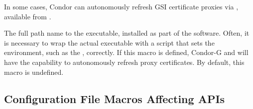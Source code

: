 In some cases, Condor can autonomously refresh GSI certificate proxies
via , available from
.

\begin{description}

\label{param:MyProxyGetDelegation}
\item[\Macro{MYPROXY\_GET\_DELEGATION}]
  The full path name to the
   executable, installed as part of the
   software.  Often, it is necessary to wrap the actual
  executable with a script that sets the environment, such as the
  , correctly.  If this macro is defined,
  Condor-G and  will have the capability to autonomously
  refresh proxy certificates.  By default, this macro is undefined.

\end{description}

\subsection{\label{sec:API-Config-File-Entries}
Configuration File Macros Affecting APIs}

